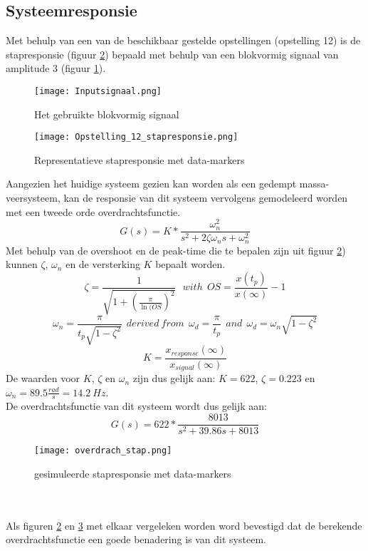 \documentclass[a4paper]{article}
\begin{document}
\subsection{Systeemresponsie}
Met behulp van een van de beschikbaar gestelde opstellingen (opstelling 12) is de stapresponsie (figuur \ref{opstelling_stapresp}) bepaald met behulp van een blokvormig signaal van amplitude 3 (figuur \ref{blokvormig}).
\begin{figure}[h]
\label{blokvormig}
  \centering
    \texttt{[image: Inputsignaal.png]}
    \caption{Het gebruikte blokvormig signaal}
\end{figure}

\begin{figure}[h]
\label{opstelling_stapresp}
  \centering
    \texttt{[image: Opstelling\_12\_stapresponsie.png]}
    \caption{Representatieve stapresponsie met data-markers}
\end{figure}

Aangezien het huidige systeem gezien kan worden als een gedempt massa-veersysteem, kan de responsie van dit systeem vervolgens gemodeleerd worden met een tweede orde overdrachtsfunctie. 
\begin{equation}
G(s) = K * \frac{\omega_n^2}{s^2 + 2 \zeta \omega_n s + \omega_n^2}
\end{equation}
Met behulp van de overshoot en de peak-time die te bepalen zijn uit figuur \ref{opstelling_stapresp}) kunnen $\zeta$, $\omega_n$ en de versterking $K$ bepaalt worden.
\begin{equation}
\zeta = \frac{1}{\sqrt{1 + (\frac{\pi}{\ln(OS})^2}} \ \ \ with \ \ OS = \frac{x(t_p)}{x(\infty)} -1
\end{equation}
\begin{equation}
\omega_n = \frac{\pi}{t_p \sqrt{1 - \zeta^2}} \ \ derived \ from \ \ \omega_d = \frac{\pi}{t_p} \ \ and \ \ \omega_d = \omega_n \sqrt{1-\zeta^2}
\end{equation}
\begin{equation}
K = \frac{x_{response}(\infty)}{x_{signal}(\infty)}
\end{equation}
De waarden voor $K$, $\zeta$ en $\omega_n$ zijn dus gelijk aan: $ K = 622$, 
$\zeta = 0.223$ en $\omega_n = 89.5 \frac{rad}{s} = 14.2 \ Hz$.\\
De overdrachtsfunctie van dit systeem wordt dus gelijk aan:
\begin{equation}
G(s) = 622 * \frac{8013}{s^2 + 39.86 s + 8013}
\end{equation}
\begin{figure}[h]
\label{benadering_stapresp}
  \centering
    \texttt{[image: overdrach\_stap.png]}
    \caption{gesimuleerde stapresponsie met data-markers}
\end{figure}
\\ \\
Als figuren \ref{opstelling_stapresp} en \ref{benadering_stapresp} met elkaar vergeleken worden word bevestigd dat de berekende overdrachtsfunctie een goede benadering is van dit systeem.
\end{document}
